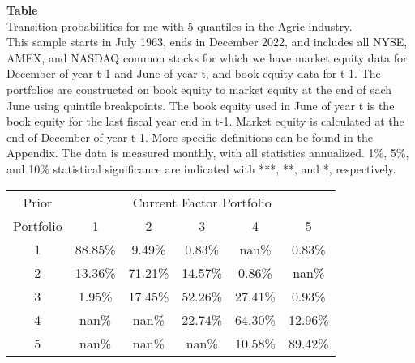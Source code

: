 \begin{table*}[ht!]
\raggedright
{}
\label{tab: transition_probs_me_Agric_with_5_quantiles}
\textbf{Table \thetable} \\
Transition probabilities for me with 5 quantiles in the Agric industry. \\
\hspace*{1em}This sample starts in July 1963, ends in December 2022, and includes all NYSE, AMEX, and NASDAQ common stocks for which we have market equity data for December of year t-1 and June of year t, and book equity data for t-1. The portfolios are constructed on book equity to market equity at the end of each June using quintile breakpoints.  The book equity used in June of year t is the book equity for the last fiscal year end in t-1.  Market equity is calculated at the end of December of year t-1.  More specific definitions can be found in the Appendix.  The data is measured monthly, with all statistics annualized.  1\%, 5\%, and 10\% statistical significance are indicated with ***, **, and *, respectively. \\
\vspace{0.5em}
\centering
\begin{adjustbox}{max width=\textwidth}
\begin{tabular}{@{}cccccc@{}}
\toprule
Prior & \multicolumn{5}{c}{Current Factor Portfolio} \\
Portfolio & 1 & 2 & 3 & 4 & 5 \\
\midrule
1 & 88.85\% & 9.49\% & 0.83\% & nan\% & 0.83\% \\
2 & 13.36\% & 71.21\% & 14.57\% & 0.86\% & nan\% \\
3 & 1.95\% & 17.45\% & 52.26\% & 27.41\% & 0.93\% \\
4 & nan\% & nan\% & 22.74\% & 64.30\% & 12.96\% \\
5 & nan\% & nan\% & nan\% & 10.58\% & 89.42\% \\
\bottomrule
\end{tabular}
\end{adjustbox}
\end{table*}